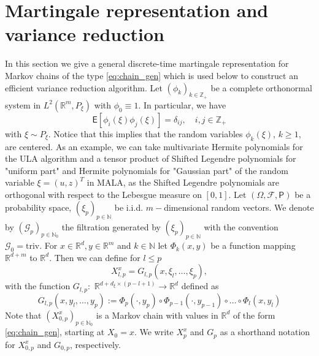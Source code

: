 \documentclass[bj]{imsart}
\def\nset{\mathbb{N}}
\def\rset{\mathbb{R}}
\def\rset{\mathbb{R}}
\begin{document}
\section{Martingale representation and variance reduction}
\label{seq:mart_repr}
In this section we give a general discrete-time martingale representation for  Markov chains of the type  \eqref{eq:chain_gen} which is  used below to construct an efficient variance reduction algorithm. Let \((\phi_k)_{k\in \mathbb{Z}_+}\) be a complete orthonormal system in \(L^2(\mathbb{R}^m, P_{\xi})\) with \(\phi_0\equiv 1\).  In particular, we have
\begin{equation*}
\mathsf{E}[\phi_i(\xi)\phi_j(\xi)]=\delta_{ij},\quad i,j\in  \mathbb{Z}_{+}
\end{equation*}
with \(\xi \sim P_{\xi}.\)
Notice that this implies that the random variables
$\phi_k(\xi)$, $k\ge1$, are centered. As an example, we can take  multivariate Hermite polynomials for the ULA algorithm and a tensor product of Shifted Legendre polynomials for "uniform part" and Hermite polynomials for "Gaussian part"  of the random variable $\xi = (u, z)^T$ in MALA, as the Shifted Legendre polynomials are orthogonal with respect to the Lebesgue measure on \([0,1].\)  Let $\left(\Omega,\mathcal{F},\mathsf{P}\right)$ be a probability space, $(\xi_p)_{p \in \nset}$ be i.i.d. $m-$dimensional random vectors. We denote by $(\mathcal{G}_p)_{p \in \nset_0}$  the filtration generated by $(\xi_p)_{p \in \nset}$ with the convention $\mathcal{G}_0=\mathrm{triv}$. For  $x \in \rset^d, y \in \rset^{m}$ and $k \in \nset$ let $\Phi_k(x,y)$ be a function mapping $\rset^{d+m}$ to $\rset^d$. Then we can define for $l \le p$
\begin{equation}
\label{eq:ula_new}
X^x_{l,p}=G_{l,p}(x,\xi_{l},\ldots,\xi_{p}),
\end{equation}
with the function \(G_{l,p}:\) \(\rset^{d + d_{\xi}\times(p-l+1)}\to \rset^{d}\) defined as
\begin{equation}
\label{eq:definition-G-p-l}
G_{l,p}(x,y_l,\ldots,y_p):=\Phi_p(\cdot,y_{p})\circ\Phi_{p-1}(\cdot,y_{p-1})\circ\dots\circ\Phi_{l}(x,y_{l})
\end{equation}
Note that $\left(X^x_{0,p}\right)_{p \in \nset_0}$ is a Markov chain with values in $\rset^d$ of the form \eqref{eq:chain_gen}, starting at $X_0 = x$. We write $X^x_{p}$ and $G_{p}$ as a shorthand notation for $X^x_{0,p}$ and $G_{0,p}$, respectively. 
\end{document}
